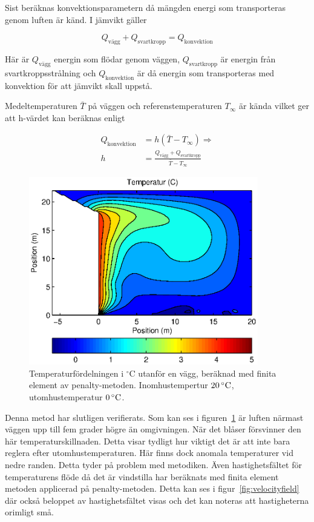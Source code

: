 Sist beräknas konvektionsparametern då mängden energi som transporteras
genom luften är känd. I jämvikt gäller

\begin{equation}
\label{eq:convectionmethod:balance}
Q_\text{vägg} + Q_\text{svartkropp} = Q_\text{konvektion}
\end{equation}

Här är $Q_\text{vägg}$ energin som flödar genom väggen, $Q_\text{svartkropp}$ är energin från
svartkroppsstrålning och $Q_\text{konvektion}$ är då energin som transporteras med konvektion
för att jämvikt skall uppstå.

Medeltemperaturen $\bar{T}$ på väggen och referenstemperaturen $T_\infty$ är kända
vilket ger att h-värdet kan beräknas enligt

\begin{align}
Q_\text{konvektion} &= h(\bar{T}-T_\infty) \Rightarrow \nonumber \\
h &= \frac{Q_\text{vägg} + Q_\text{svartkropp}}{\bar{T}-T_\infty}
\end{align}


\begin{figure}[hpbt]
\centering
\includegraphics[width=10cm]{images/convectemperature.eps}
\caption{\label{fig:temp_dist}Temperaturfördelningen i $^\circ\mbox{C}$ utanför en vägg, beräknad med finita element av penalty-metoden. Inomhus\-tempertur $\unit[20]{^\circ C}$, utomhustemperatur $\unit[0]{^\circ C}$.}
\end{figure}

Denna metod har slutligen verifierats. Som kan ses i figuren~\ref{fig:temp_dist} är luften närmast väggen upp till fem grader 
högre än omgivningen. När det blåser försvinner den här temperaturskillnaden. Detta
visar tydligt hur viktigt det är att inte bara reglera efter utomhustemperaturen.
Här finns dock anomala temperaturer vid nedre randen. Detta tyder på problem med
metodiken.
Även hastighetsfältet för temperaturens flöde då det är vindstilla har beräknats med finita element metoden
applicerad på penalty-metoden. Detta kan ses i figur~\ref{fig:velocityfield} där också
beloppet av hastighetsfältet visas och det kan noteras att hastigheterna orimligt små.

